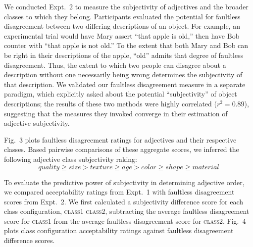 \documentclass[12pt]{article}
\begin{document}
We conducted Expt.~2 to measure the subjectivity of adjectives and the broader classes to which they belong. Participants evaluated the potential for faultless disagreement between two differing descriptions of an object. For example, an experimental trial would have Mary assert ``that apple is old,'' then have Bob counter with ``that apple is not old.'' To the extent that both Mary and Bob can be right in their descriptions of the apple, ``old'' admits that degree of faultless disagreement. 
Thus, the extent to which two people can disagree about a description without one necessarily being wrong determines the subjectivity of that description. We validated our faultless disagreement measure in a separate paradigm, which explicitly asked about the potential ``subjectivity'' of object descriptions; the results of these two methods were highly correlated ($r^{2} = 0.89$), suggesting that the measures they invoked converge in their estimation of adjective subjectivity.

Fig.~3 plots faultless disagreement ratings for adjectives and their respective classes. Based pairwise comparisons of these aggregate scores, we inferred the following adjective class subjectivity raking:
$$ quality \geq size > texture \geq age > color \geq shape \geq material \label{inferred-subjectivity}$$

To evaluate the predictive power of subjectivity in determining adjective order, we compared acceptability ratings from Expt.~1 with faultless disagreement scores from Expt.\ 2. We first calculated a subjectivity difference score for each class configuration, \textsc{class1} \textsc{class2}, subtracting the average faultless disagreement score for \textsc{class1} from the average faultless disagreement score for \textsc{class2}. Fig.~4 plots class configuration acceptability ratings against faultless disagreement difference scores.
\end{document}
